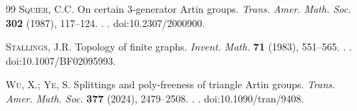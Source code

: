 \documentclass[11pt,hyp,]{nyjm}
\theoremstyle{definition}
\begin{document}
\begin{thebibliography}{99}
{\scshape Squier, C.C.}
On certain $3$-generator Artin groups.
{\em Trans. Amer. Math. Soc.} {\bf 302} (1987), 117--124.
.
.
doi:10.2307/2000900.

{\scshape Stallings, J.R.}
Topology of finite graphs.
{\em Invent. Math.} {\bf 71} (1983), 551--565.
.
.
doi:10.1007/BF02095993.

{\scshape Wu, X.; Ye, S.}
Splittings and poly-freeness of triangle Artin groups.
{\em Trans. Amer. Math. Soc.} {\bf 377} (2024), 2479--2508.
.
.
doi:10.1090/tran/9408.

\end{thebibliography}
\end{document}
